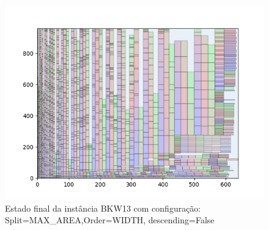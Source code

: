 \begin{figure}[H]
    \centering
    \caption[]{Estado final da instância BKW13 com configuração: Split=MAX_AREA,Order=WIDTH, descending=False}
    \label{fig:bkw13-max_area-width-false}
    \includegraphics[scale=0.5]{output/figures/bkw/bkw13/max_area/width/false/0000}
\end{figure}